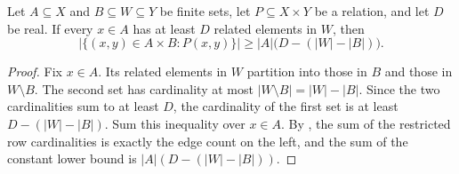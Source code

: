 \begin{lemma}
Let $A\subseteq X$ and $B\subseteq W\subseteq Y$ be finite sets, let
$P\subseteq X\times Y$ be a relation, and let $D$ be real.  If every
$x\in A$ has at least $D$ related elements in $W$, then
\[
 |\{(x,y)\in A\times B:P(x,y)\}|\geq
 |A|\bigl(D-(|W|-|B|)\bigr).
\]
\end{lemma}
\begin{proof}
Fix $x\in A$.  Its related elements in $W$ partition into those in $B$
and those in $W\setminus B$.  The second set has cardinality at most
$|W\setminus B|=|W|-|B|$.  Since the two cardinalities sum to at least
$D$, the cardinality of the first set is at least $D-(|W|-|B|)$.
Sum this inequality over $x\in A$.  By
, the sum of the restricted row
cardinalities is exactly the edge count on the left, and the sum of the
constant lower bound is $|A|(D-(|W|-|B|))$.
\end{proof}
